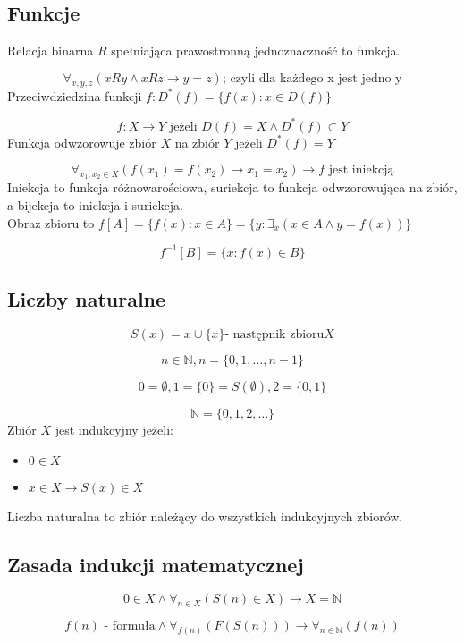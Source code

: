 \documentclass{../notatki}
\begin{document}
\subsection{Funkcje}

Relacja binarna $R$ spełniająca prawostronną jednoznaczność to funkcja.

$$
\forall_{x,y,z}(xRy \land xRz \rightarrow y = z)\text{; czyli dla każdego x
jest jedno y}
$$
Przeciwdziedzina funkcji $f: D^*(f) = \{f(x) : x \in D(f)\}$

$$
f: X \rightarrow Y \text{ jeżeli } D(f)=X \land D^*(f) \subset Y
$$
Funkcja odwzorowuje zbiór $X$ na zbiór $Y$ jeżeli $D^*(f)=Y$

$$
\forall_{x_1, x_2 \in X}(f(x_1) = f(x_2) \rightarrow x_1 = x_2)
\rightarrow f\text{ jest iniekcją}
$$
Iniekcja to funkcja różnowarościowa, suriekcja to funkcja
odwzorowująca na zbiór,
a bijekcja to iniekcja i suriekcja. \\
Obraz zbioru to $f[A] = \{f(x) : x \in A\} = \{y: \exists_x(x \in A
\land y = f(x))\}$

$$
f^{-1}[B] = \{x: f(x) \in B\}
$$

\subsection{Liczby naturalne}

$$
S(x) = x \cup \{x\} \text{- następnik zbioru} X
$$

$$
n \in \mathbb{N}, n = \{0, 1, \dots, n-1\}
$$

$$
0 = \emptyset, 1 = \{0\} = S(\emptyset), 2 = \{0, 1\}
$$

$$
\mathbb{N} = \{0, 1, 2, \dots\}
$$
Zbiór $X$ jest indukcyjny jeżeli:

\begin{itemize}
  \item $0 \in X$
  \item $x \in X \rightarrow S(x) \in X$
\end{itemize}
Liczba naturalna to zbiór należący do wszystkich indukcyjnych zbiorów.

\subsection{Zasada indukcji matematycznej}

$$
0 \in X \land \forall_{n \in X}(S(n) \in X) \rightarrow X = \mathbb{N}
$$

$$
f(n) \text{ - formuła} \land \forall_{f(n)}(F(S(n))) \rightarrow
\forall_{n \in \mathbb{N}}(f(n))
$$
\end{document}
